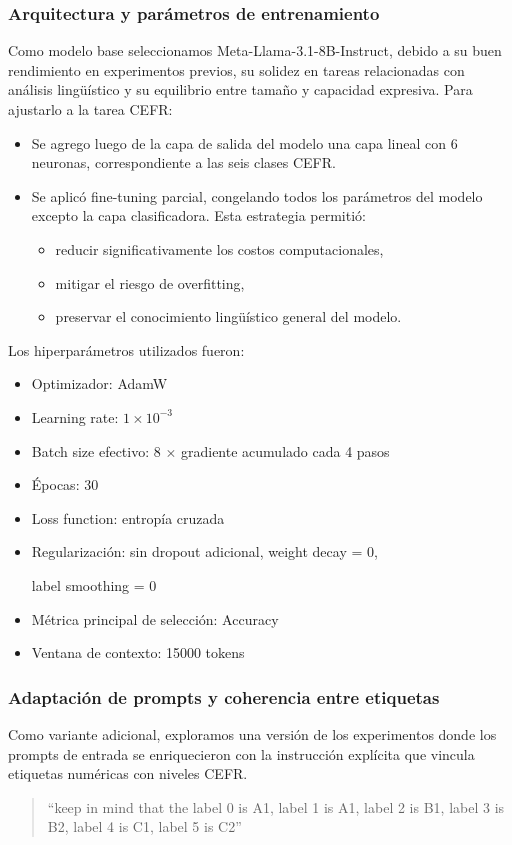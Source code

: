 \subsubsection{Arquitectura y parámetros de entrenamiento}
Como modelo base seleccionamos Meta-Llama-3.1-8B-Instruct, debido a su buen rendimiento en experimentos previos, su solidez en tareas relacionadas con análisis lingüístico y su equilibrio entre tamaño y capacidad expresiva. Para ajustarlo a la tarea CEFR:
\begin{itemize}
    \item Se agrego luego de la capa de salida del modelo una capa lineal con 6 neuronas, correspondiente a las seis clases CEFR.
    \item Se aplicó fine-tuning parcial, congelando todos los parámetros del modelo excepto la capa clasificadora. Esta estrategia permitió:
    \begin{itemize}
        \item reducir significativamente los costos computacionales,
        \item mitigar el riesgo de overfitting,
        \item preservar el conocimiento lingüístico general del modelo.
    \end{itemize}
\end{itemize}

Los hiperparámetros utilizados fueron:
\begin{itemize}
    \item Optimizador: AdamW
    \item Learning rate: $1 \times 10^{-3}$
    \item Batch size efectivo: 8 $\times$ gradiente acumulado cada 4 pasos
    \item Épocas: 30
    \item Loss function: entropía cruzada
    \item Regularización: sin dropout adicional, weight decay = 0,
    
    label smoothing = 0
    \item Métrica principal de selección: Accuracy
    \item Ventana de contexto: 15000 tokens
\end{itemize}

\subsubsection{Adaptación de prompts y coherencia entre etiquetas}
Como variante adicional, exploramos una versión de los experimentos donde los prompts de entrada se enriquecieron con la instrucción explícita que vincula etiquetas numéricas con niveles CEFR.
\begin{quote}
``keep in mind that the label 0 is A1, label 1 is A1, label 2 is B1, label 3 is B2, label 4 is C1, label 5 is C2''
\end{quote}


